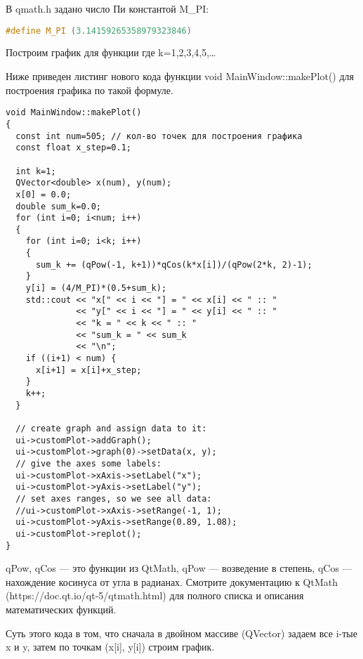 В qmath.h задано число Пи константой M\_PI:
\begin{lstlisting}[language=c++]
#define M_PI (3.14159265358979323846)
\end{lstlisting}

Построим график для функции
где k=1,2,3,4,5,…

Ниже приведен листинг нового кода функции void MainWindow::makePlot() для построения графика по такой формуле.

\begin{verbatim}
void MainWindow::makePlot()
{
  const int num=505; // кол-во точек для построения графика
  const float x_step=0.1;

  int k=1;
  QVector<double> x(num), y(num);
  x[0] = 0.0;
  double sum_k=0.0;
  for (int i=0; i<num; i++)
  {
    for (int i=0; i<k; i++)
    {
      sum_k += (qPow(-1, k+1))*qCos(k*x[i])/(qPow(2*k, 2)-1);
    }
    y[i] = (4/M_PI)*(0.5+sum_k);
    std::cout << "x[" << i << "] = " << x[i] << " :: "
              << "y[" << i << "] = " << y[i] << " :: "
              << "k = " << k << " :: "
              << "sum_k = " << sum_k
              << "\n";
    if ((i+1) < num) {
      x[i+1] = x[i]+x_step;
    }
    k++;
  }

  // create graph and assign data to it:
  ui->customPlot->addGraph();
  ui->customPlot->graph(0)->setData(x, y);
  // give the axes some labels:
  ui->customPlot->xAxis->setLabel("x");
  ui->customPlot->yAxis->setLabel("y");
  // set axes ranges, so we see all data:
  //ui->customPlot->xAxis->setRange(-1, 1);
  ui->customPlot->yAxis->setRange(0.89, 1.08);
  ui->customPlot->replot();
}
\end{verbatim}

qPow, qCos — это функции из QtMath, qPow — возведение в степень, qCos — нахождение косинуса от угла в радианах. Смотрите документацию к QtMath (https://doc.qt.io/qt-5/qtmath.html) для полного списка и описания математических функций.

Суть этого кода в том, что сначала в двойном массиве (QVector) задаем все i-тые x и y, затем по точкам (x[i], y[i]) строим график.


\clearpage
